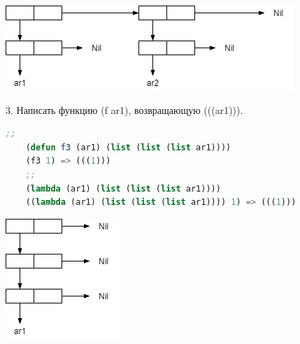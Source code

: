 \documentclass[12pt]{report}
\begin{document}
\includegraphics[scale=0.7]{img/2}


3. Написать функцию (f ar1), возвращающую (((ar1))).
\begin{lstlisting}[language=Lisp]
	;;
	(defun f3 (ar1) (list (list (list ar1))))
	(f3 1) => (((1)))
	;;
	(lambda (ar1) (list (list (list ar1))))
	((lambda (ar1) (list (list (list ar1)))) 1) => (((1)))
\end{lstlisting}

\includegraphics[scale=0.7]{img/3}

	
	
	
\end{document}
